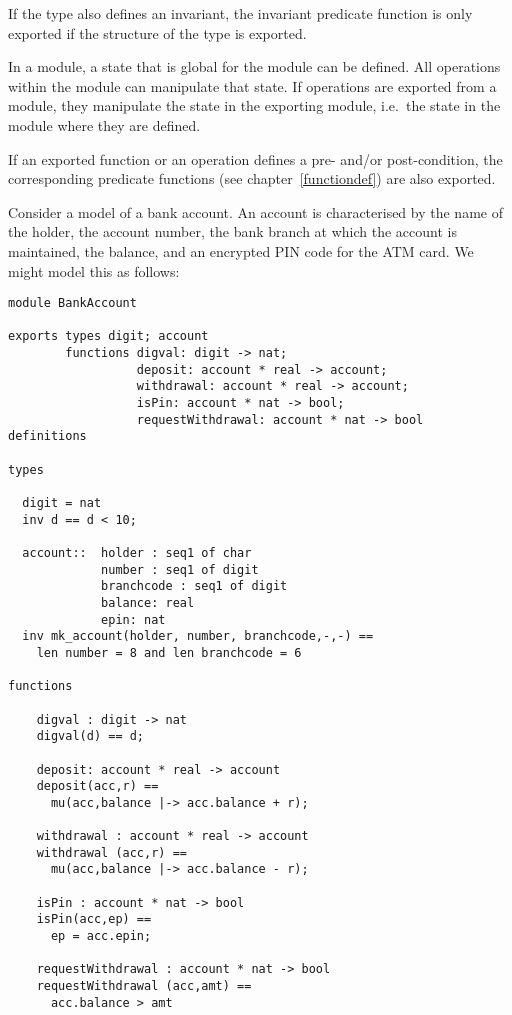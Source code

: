 \documentclass{overturerepchap}
\begin{document}
{\begin{description}
\begin{description}
    If the type also defines an invariant, the invariant predicate function
    is only exported if the structure of the type is exported.

  \item[Operations:] In a module, a state that is global for
    the module can be defined. All operations within the module can
    manipulate that state. If operations are exported from a module, they
     manipulate the state in the exporting module,
      i.e.\ the state in the module where they are defined.
  \end{description}

  If an exported function or an operation defines a pre- and/or
  post-condition, the corresponding predicate functions (see
  chapter~\ref{functiondef}) are also exported.

\item[Examples:] Consider a model of a bank account. An account is
characterised by the name of the holder, the account number, the
bank branch at which the account is maintained, the balance, and an
encrypted PIN code for the ATM card. We might model this as follows:
\begin{lstlisting}
module BankAccount

exports types digit; account
        functions digval: digit -> nat;
                  deposit: account * real -> account;
                  withdrawal: account * real -> account;
                  isPin: account * nat -> bool;
                  requestWithdrawal: account * nat -> bool
definitions

types

  digit = nat
  inv d == d < 10;

  account::  holder : seq1 of char
             number : seq1 of digit
             branchcode : seq1 of digit
             balance: real
             epin: nat
  inv mk_account(holder, number, branchcode,-,-) ==
    len number = 8 and len branchcode = 6

functions

    digval : digit -> nat
    digval(d) == d;

    deposit: account * real -> account
    deposit(acc,r) ==
      mu(acc,balance |-> acc.balance + r);

    withdrawal : account * real -> account
    withdrawal (acc,r) ==
      mu(acc,balance |-> acc.balance - r);

    isPin : account * nat -> bool
    isPin(acc,ep) ==
      ep = acc.epin;

    requestWithdrawal : account * nat -> bool
    requestWithdrawal (acc,amt) ==
      acc.balance > amt


\end{lstlisting}
\end{description}}
\end{document}
